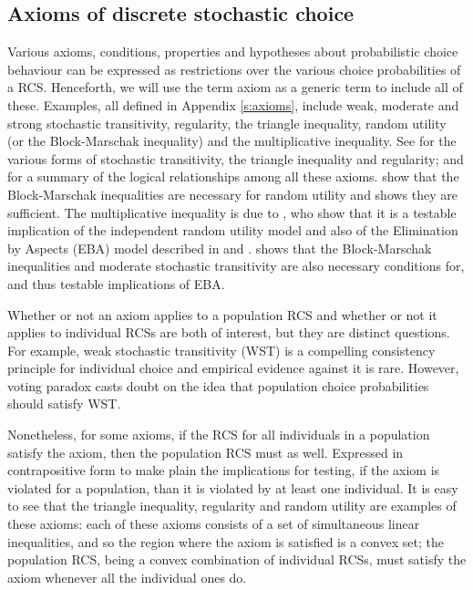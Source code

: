 \documentclass[11pt,letter]{article}
\begin{document}
\subsection{Axioms of discrete stochastic choice}

Various axioms, conditions, properties and hypotheses about probabilistic choice behaviour can be expressed as restrictions over the various choice probabilities of a RCS.
Henceforth, we will use the term axiom as a generic term to include all of these.
Examples, all defined in Appendix \ref{s:axioms}, include weak, moderate and strong stochastic transitivity, regularity, the triangle inequality, random utility (or the Block-Marschak inequality) and the multiplicative inequality.
See  for the various forms of stochastic transitivity, the triangle inequality and regularity; and  for a summary of the logical relationships among all these axioms.
 show that the Block-Marschak inequalities are necessary for random utility and 
 shows they are sufficient.
The multiplicative inequality is due to , who show that it is a testable implication of the independent random utility model and also of the Elimination by Aspects (EBA) model described in  and .
 shows that the Block-Marschak inequalities and moderate stochastic transitivity are also necessary conditions for, and thus testable implications of EBA.

Whether or not an axiom applies to a population RCS and whether or not it applies to individual RCSs are both of interest, but they are distinct questions.
For example, weak stochastic transitivity (WST) is a compelling consistency principle for individual choice and empirical evidence against it is rare. However,  voting paradox casts doubt on the idea that population choice probabilities should satisfy WST.

Nonetheless, for some axioms, if the RCS for all individuals in a population satisfy the axiom, then the population RCS must as well.
Expressed in contrapositive form to make plain the implications for testing, if the axiom is violated for a population, than it is violated by at least one individual.
It is easy to see that the triangle inequality, regularity and random utility are examples of these axioms:
each of these axioms consists of a set of simultaneous linear inequalities, and so the region where the axiom is satisfied is a convex set; the population RCS, being a convex combination of individual RCSs, must satisfy the axiom whenever all the individual ones do.
\end{document}
